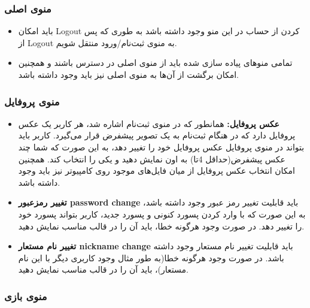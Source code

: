 \documentclass[]{article}
\begin{document}
\subsubsection*{{\titr منوی اصلی}}
\begin{itemize}
\item باید امکان Logout کردن از حساب در این منو وجود داشته باشد به طوری که پس از Logout به منوی ثبت‌نام/ورود منتقل شویم.

\item تمامی منوهای پیاده سازی شده باید از منوی اصلی در دسترس باشند و همچنین امکان برگشت از آن‌ها به منوی اصلی نیز باید وجود داشته باشد.
\end{itemize}



\subsubsection*{{\titr منوی پروفایل}}
\begin{itemize}
\item \textbf{عکس پروفایل:} همانطور که در منوی ثبت‌نام اشاره شد، هر کاربر یک عکس پروفایل دارد که در هنگام ثبت‌نام به یک تصویر پیشفرض قرار می‌گیرد. کاربر باید بتواند در منوی پروفایل عکس پروفایل خود را تغییر دهد، به این صورت که شما چند عکس پیشفرض(حداقل 4تا) به اون نمایش دهید و یکی را انتخاب کند. همچنین امکان انتخاب عکس پروفایل از میان فایل‌های موجود روی کامپیوتر نیز باید وجود داشته باشد.

\item \textbf{تغییر رمزعبور password change} باید قابلیت تغییر رمز عبور وجود داشته باشد، به این صورت که با وارد کردن پسورد کنونی و پسورد جدید، کاربر بتواند پسورد خود را تغییر دهد. در صورت وجود هرگونه خطا، باید آن را در قالب مناسب نمایش دهید.

\item \textbf{تغییر نام مستعار nickname change} باید قابلیت تغییر نام مستعار وجود داشته باشد. در صورت وجود هرگونه خطا(به طور مثال وجود کاربری دیگر با این نام مستعار)، باید آن را در قالب مناسب نمایش دهید.

\end{itemize}

\subsubsection*{{\titr منوی بازی}}
\end{document}
